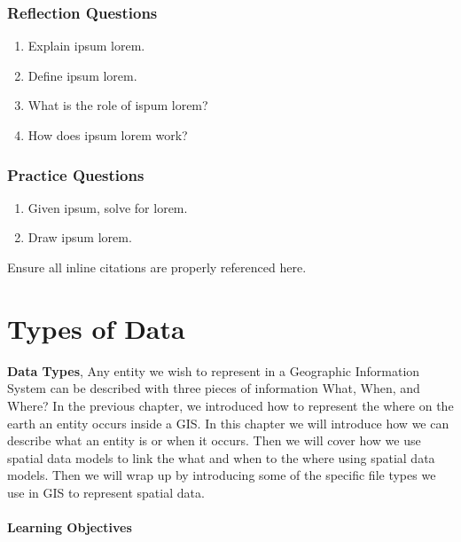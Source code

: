 \documentclass[
]{book}
\providecommand{\tightlist}{%
  \setlength{\itemsep}{0pt}\setlength{\parskip}{0pt}}
\begin{document}
\hypertarget{reflection-questions}{%
\subsection*{Reflection Questions}\label{reflection-questions}}

\begin{enumerate}
\def\labelenumi{\arabic{enumi}.}
\tightlist
\item
  Explain ipsum lorem.
\item
  Define ipsum lorem.
\item
  What is the role of ispum lorem?
\item
  How does ipsum lorem work?
\end{enumerate}

\hypertarget{practice-questions}{%
\subsection*{Practice Questions}\label{practice-questions}}

\begin{enumerate}
\def\labelenumi{\arabic{enumi}.}
\setcounter{enumi}{1}
\tightlist
\item
  Given ipsum, solve for lorem.
\item
  Draw ipsum lorem.
\end{enumerate}

Ensure all inline citations are properly referenced here.

\hypertarget{types-of-data}{%
\chapter{Types of Data}\label{types-of-data}}

\textbf{Data Types}, Any entity we wish to represent in a Geographic Information System can be described with three pieces of information What, When, and Where? In the previous chapter, we introduced how to represent the where on the earth an entity occurs inside a GIS. In this chapter we will introduce how we can describe what an entity is or when it occurs. Then we will cover how we use spatial data models to link the what and when to the where using spatial data models. Then we will wrap up by introducing some of the specific file types we use in GIS to represent spatial data.

\hypertarget{learning-objectives-2}{%
\subsubsection*{Learning Objectives}\label{learning-objectives-2}}
\end{document}

